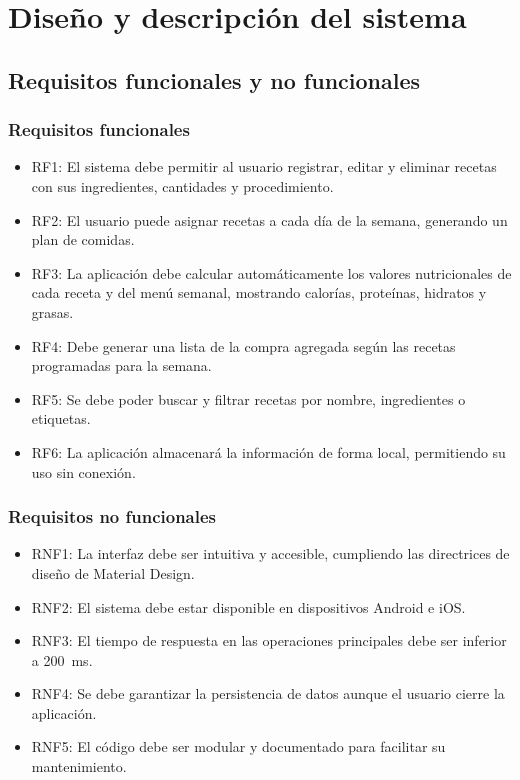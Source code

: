 \documentclass[twoside, openright, 11pt]{report}
\begin{document}
\chapter{Diseño y descripción del sistema}\label{cap.diseno y descripcion del sistema}
\section{Requisitos funcionales y no funcionales}
\subsection{Requisitos funcionales}
\begin{itemize}
  \item RF1: El sistema debe permitir al usuario registrar, editar y eliminar recetas con sus ingredientes, cantidades y procedimiento.
  \item RF2: El usuario puede asignar recetas a cada día de la semana, generando un plan de comidas.
  \item RF3: La aplicación debe calcular automáticamente los valores nutricionales de cada receta y del menú semanal, mostrando calorías, proteínas, hidratos y grasas.
  \item RF4: Debe generar una lista de la compra agregada según las recetas programadas para la semana.
  \item RF5: Se debe poder buscar y filtrar recetas por nombre, ingredientes o etiquetas.
  \item RF6: La aplicación almacenará la información de forma local, permitiendo su uso sin conexión.
\end{itemize}
\subsection{Requisitos no funcionales}
\begin{itemize}
  \item RNF1: La interfaz debe ser intuitiva y accesible, cumpliendo las directrices de diseño de Material Design.
  \item RNF2: El sistema debe estar disponible en dispositivos Android e iOS.
  \item RNF3: El tiempo de respuesta en las operaciones principales debe ser inferior a 200~ms.
  \item RNF4: Se debe garantizar la persistencia de datos aunque el usuario cierre la aplicación.
  \item RNF5: El código debe ser modular y documentado para facilitar su mantenimiento.
\end{itemize}
\end{document}
